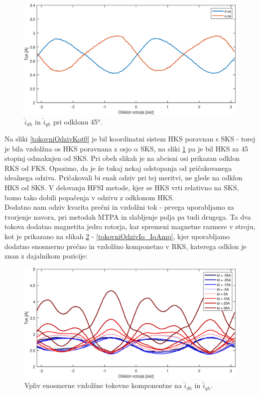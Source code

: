 \documentclass[a4paper,twoside,openright,12pt,slovene]{book}
\begin{document}
\begin{figure}[!htbp]
    \centering
    \includegraphics[width=0.95\columnwidth]{Slike/tokovniOdzivKot45.eps}
    \caption{\label{tokovniOdzivKot45} $\hat{i}_{dh}$ in $\hat{i}_{qh}$ pri odklonu 45°.}
\end{figure}

Na sliki \ref{tokovniOdzivKot0} je bil koordinatni sistem HKS poravnan s SKS - torej je bila vzdolžna os HKS poravnana z osjo $\alpha$ SKS, na sliki \ref{tokovniOdzivKot45} pa je bil HKS za 45 stopinj
odmaknjen od SKS. Pri obeh slikah je na abcisni osi prikazan odklon RKS od FKS. Opazimo, da je že tukaj nekaj odstopanja od pričakovanega idealnega odziva. Pričakovali bi enak odziv pri tej meritvi,
ne glede na odklon HKS od SKS. V delovanju HFSI metode, kjer se HKS vrti relativno na SKS, bomo tako dobili popačenja v odzivu z odklonom HKS.
\\
Dodatno nam odziv kvarita prečni in vzdolžni tok - prvega uporabljamo za tvorjenje navora, pri metodah MTPA in slabljenje polja pa tudi drugega. Ta dva tokova
dodatno magnetita jedro rotorja, kar spremeni magnetne razmere v stroju, kot je prikazano na slikah \ref{tokovniOdzivId} - \ref{tokovniOdzivIq_IqAmp}, kjer uporabljamo dodatno enosmerno prečno in
vzdolžno komponetno v RKS, katerega odklon je znan z dajalnikom pozicije:

\begin{figure}[!htbp]
    \centering
    \includegraphics[width=0.95\columnwidth]{Slike/tokovniOdzivId.eps}
    \caption{\label{tokovniOdzivId} Vpliv enosmerne vzdolžne tokovne komponentne na $\hat{i}_{dh}$ in $\hat{i}_{qh}$.}
\end{figure}
\end{document}
